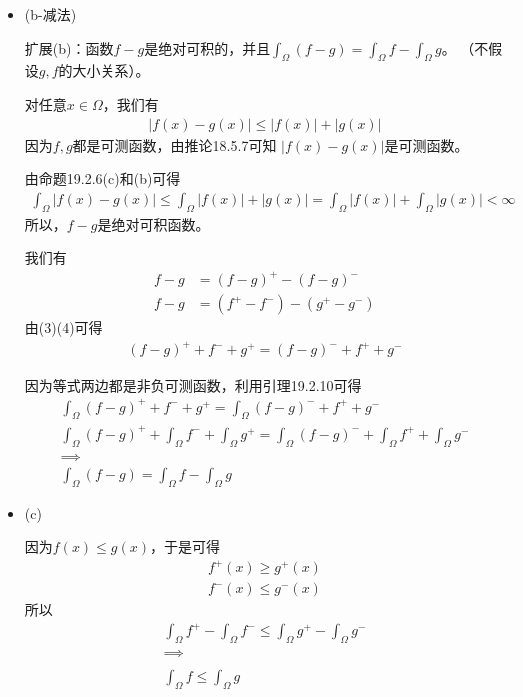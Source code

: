 \documentclass{article}
\begin{document}
\begin{itemize}
  \item (b-减法)

        扩展(b)：函数$f - g$是绝对可积的，并且$\int_{\Omega} (f - g) = \int_{\Omega} f - \int_{\Omega} g$。
        （不假设$g,f$的大小关系）。

        对任意$x \in \Omega$，我们有
        \begin{align*}
          |f(x) - g(x)| \leq |f(x)| + |g(x)|
        \end{align*}
        因为$f, g$都是可测函数，由推论18.5.7可知
        $|f(x) - g(x)|$是可测函数。

        由命题19.2.6(c)和(b)可得
        \begin{align*}
          \int_{\Omega} |f(x) - g(x)|
          \leq \int_{\Omega} |f(x)| + |g(x)|
          = \int_{\Omega} |f(x)| + \int_{\Omega} |g(x)|
          < \infty
        \end{align*}
        所以，$f - g$是绝对可积函数。

        我们有
        \begin{align}
          f - g & = (f - g)^+ - (f - g)^-     \\
          f - g & = (f^+ - f^-) - (g^+ - g^-)
        \end{align}
        由(3)(4)可得
        \begin{align*}
          (f - g)^+ + f^- + g^+= (f - g)^- + f^+ + g^-
        \end{align*}

        因为等式两边都是非负可测函数，利用引理19.2.10可得
        \begin{align*}
          \int_{\Omega} (f - g)^+ + f^- + g^+ = \int_{\Omega} (f - g)^- + f^+ + g^- \\
          \int_{\Omega} (f - g)^+ + \int_{\Omega} f^- + \int_{\Omega} g^+
          = \int_{\Omega} (f - g)^- + \int_{\Omega} f^+ + \int_{\Omega} g^-         \\
          \implies                                                                  \\
          \int_{\Omega} (f - g) = \int_{\Omega} f - \int_{\Omega} g
        \end{align*}

  \item (c)

        因为$f(x) \leq g(x)$，于是可得
        \begin{align*}
          f^+(x) \geq g^+(x) \\
          f^-(x) \leq g^-(x)
        \end{align*}
        所以
        \begin{align*}
          \int_{\Omega} f^+ - \int_{\Omega} f^- \leq \int_{\Omega} g^+ - \int_{\Omega} g^- \\
          \implies                                                                         \\                                                                        \\
          \int_{\Omega} f \leq \int_{\Omega} g
        \end{align*}


\end{itemize}
\end{document}
